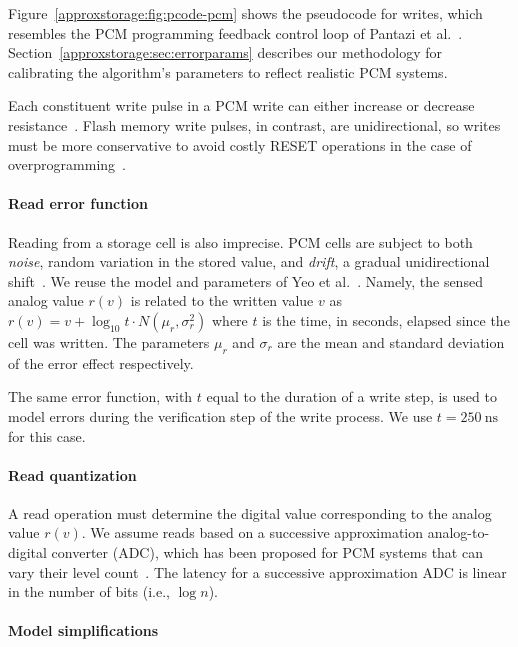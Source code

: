 Figure~\ref{approxstorage:fig:pcode-pcm} shows the pseudocode for
writes, which resembles the PCM programming feedback
control loop of Pantazi et al.~\cite{mlcmodelchar}.
Section~\ref{approxstorage:sec:errorparams} describes our methodology for
calibrating the algorithm's parameters to reflect realistic PCM
systems.

Each constituent write pulse in a PCM write can either increase or decrease
resistance~\cite{mlcprogalgo,mlcibm,mlcmodelchar}.
Flash memory write pulses, in contrast, are unidirectional, so writes
must be more conservative to avoid costly RESET operations
in the case of overprogramming~\cite{ispp}.

\paragraph{Read error function}

Reading from a storage cell is also imprecise. PCM
cells are subject to both \emph{noise}, random variation in the stored value,
and \emph{drift}, a gradual unidirectional
shift~\cite{mlcpcmreliability}. We reuse the model and parameters of
Yeo et al.~\cite{wdddmlcpcm}. Namely, the sensed
analog value $r(v)$ is related to the written value $v$ as
$r(v) = v + \log_{10} t \cdot N(\mu_r, \sigma_r^2)$
where $t$ is the time, in seconds, elapsed since the cell was written.
The parameters $\mu_r$ and $\sigma_r$ are the mean and standard
deviation of the error effect respectively.

The same error function, with $t$ equal to the duration of a write step,
is used to model errors during the verification step of the write
process. We use $t = 250~\mathrm{ns}$~\cite{writecancel,improvingwrites} for
this case.

\paragraph{Read quantization}

A read operation must determine the digital value corresponding to the
analog value $r(v)$. We assume reads based on a successive
approximation analog-to-digital converter (ADC), which has been proposed for PCM
systems that can vary their level count~\cite{morphablepcm}. The
latency for a successive approximation ADC is linear in the number of
bits (i.e., $\log n$).

\paragraph{Model simplifications}

